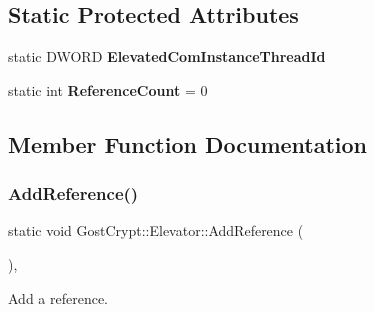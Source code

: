 \subsection*{Static Protected Attributes}
\begin{DoxyCompactItemize}
\item 
\mbox{\label{class_gost_crypt_1_1_elevator_af1942484d90bc7fe183f96568dd29c73}} 
static D\+W\+O\+RD {\bfseries Elevated\+Com\+Instance\+Thread\+Id}
\item 
\mbox{\label{class_gost_crypt_1_1_elevator_a792d16a99ab3d1932c087925c4edb9fd}} 
static int {\bfseries Reference\+Count} = 0
\end{DoxyCompactItemize}


\subsection{Member Function Documentation}
\mbox{\label{class_gost_crypt_1_1_elevator_ae5fa1c4df5968245d213dd0a3cc3d93f}} 
\subsubsection{\texorpdfstring{Add\+Reference()}{AddReference()}}
{\footnotesize\ttfamily static void Gost\+Crypt\+::\+Elevator\+::\+Add\+Reference (\begin{DoxyParamCaption}{ }\end{DoxyParamCaption})\hspace{0.3cm}{\ttfamily [inline]}, {\ttfamily [static]}}



Add a reference. 

